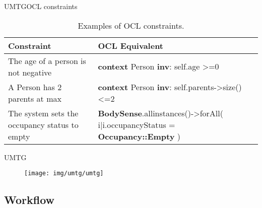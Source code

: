 \documentclass[10pt]{beamer}
\newcommand{\1}{
        	\setbeamertemplate{background}{
        		\texttt{[image: img/1]}
        		\tikz[overlay] \fill[fill opacity=0.75,fill=white] (0,0) rectangle (-\paperwidth,\paperheight);
        	}
}
\begin{document}
\begin{frame}{UMTG}{OCL constraints}	
\begin{table}
	\caption{Examples of OCL constraints.}
	\begin{tabular}{|p{4cm}|p{5.8cm}|}
		\hline 
		\textbf{Constraint} & \textbf{OCL Equivalent}   \\	\hline 
		The age of a person is not negative & \textbf{context} Person \textbf{inv}: self.age >=0 \\ \hline
		
		A Person has 2 parents at max & \textbf{context} Person \textbf{inv}: self.parents->size()<=2 \\ \hline	
		
		
		The system sets the occupancy status to empty & \textbf{BodySense}.allinstances()->forAll( i|i.occupancyStatus = \textbf{Occupancy::Empty} ) \\ \hline
		
	\end{tabular}
\end{table}	
\end{frame}

\begin{frame}{UMTG}{}	
	\begin{figure}
		\centering
		\texttt{[image: img/umtg/umtg]}
	\end{figure}	
\end{frame}




\subsection{Workflow}
\end{document}
